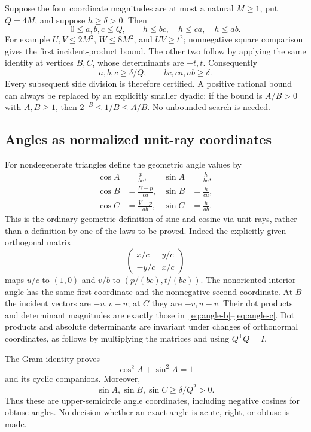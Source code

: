 \documentclass[11pt,a4paper]{article}
\theoremstyle{definition}
\numberwithin{equation}{section}
\begin{document}
Suppose the four coordinate magnitudes are at most a natural
\(M\ge1\), put \(Q=4M\), and suppose \(h\ge\delta>0\).
Then
\[
 0\le a,b,c\le Q,\qquad
 h\le bc,\quad h\le ca,\quad h\le ab.
 \tag{4.5}\label{eq:bounds}
\]
For example \(U,V\le2M^2\), \(W\le8M^2\), and \(UV\ge t^2\);
nonnegative square comparison gives the first incident-product
bound. The other two follow by applying the same identity at
vertices \(B,C\), whose determinants are \(-t,t\).
Consequently
\[
 a,b,c\ge\delta/Q,\qquad
 bc,ca,ab\ge\delta.
 \tag{4.6}\label{eq:side-lower}
\]
Every subsequent side division is therefore certified. A positive
rational bound can always be replaced by an explicitly smaller
dyadic: if the bound is \(A/B>0\) with \(A,B\ge1\), then
\(2^{-B}\le1/B\le A/B\). No unbounded search is needed.

\subsection{Angles as normalized unit-ray coordinates}

For nondegenerate triangles define the geometric angle values by
\setcounter{equation}{6}
\begin{align}
 \cos A&=\frac{p}{bc},&
 \sin A&=\frac{h}{bc},\label{eq:angle-a}\\
 \cos B&=\frac{U-p}{ca},&
 \sin B&=\frac{h}{ca},\label{eq:angle-b}\\
 \cos C&=\frac{V-p}{ab},&
 \sin C&=\frac{h}{ab}.\label{eq:angle-c}
\end{align}
This is the ordinary geometric definition of sine and cosine via
unit rays, rather than a definition by one of the laws to be proved.
Indeed the explicitly given orthogonal matrix
\[
 \begin{pmatrix}x/c&y/c\\-y/c&x/c\end{pmatrix}
\]
maps \(u/c\) to \((1,0)\) and \(v/b\) to
\((p/(bc),t/(bc))\). The nonoriented interior angle has the same
first coordinate and the nonnegative second coordinate.
At \(B\) the incident vectors are \(-u,v-u\); at \(C\) they are
\(-v,u-v\). Their dot products and determinant magnitudes are
exactly those in~\eqref{eq:angle-b}--\eqref{eq:angle-c}.
Dot products and absolute determinants are invariant under changes
of orthonormal coordinates, as follows by multiplying the matrices
and using \(Q^{\mathsf T}Q=I\).

The Gram identity proves
\[
 \cos^2 A+\sin^2 A=1
\]
and its cyclic companions. Moreover,
\[
 \sin A,\sin B,\sin C\ge\delta/Q^2>0.
 \tag{4.10}\label{eq:sin-lower}
\]
Thus these are upper-semicircle angle coordinates, including negative
cosines for obtuse angles. No decision whether an exact angle is
acute, right, or obtuse is made.
\end{document}
